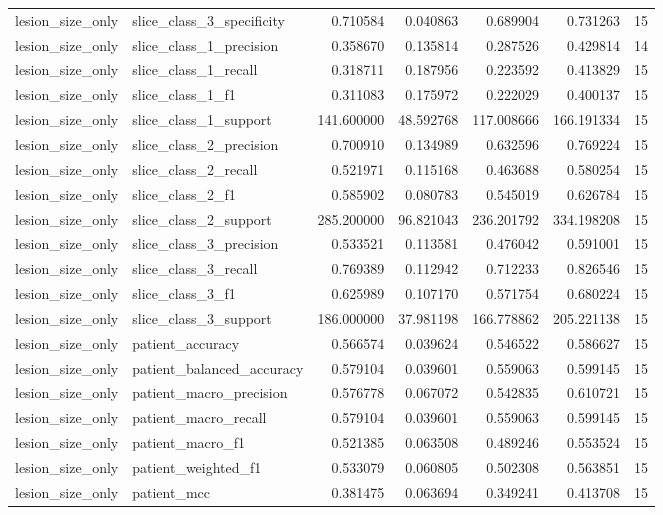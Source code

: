 \begin{tabular}{llrrrrr}
lesion_size_only & slice_class_3_specificity & 0.710584 & 0.040863 & 0.689904 & 0.731263 & 15 \\
lesion_size_only & slice_class_1_precision & 0.358670 & 0.135814 & 0.287526 & 0.429814 & 14 \\
lesion_size_only & slice_class_1_recall & 0.318711 & 0.187956 & 0.223592 & 0.413829 & 15 \\
lesion_size_only & slice_class_1_f1 & 0.311083 & 0.175972 & 0.222029 & 0.400137 & 15 \\
lesion_size_only & slice_class_1_support & 141.600000 & 48.592768 & 117.008666 & 166.191334 & 15 \\
lesion_size_only & slice_class_2_precision & 0.700910 & 0.134989 & 0.632596 & 0.769224 & 15 \\
lesion_size_only & slice_class_2_recall & 0.521971 & 0.115168 & 0.463688 & 0.580254 & 15 \\
lesion_size_only & slice_class_2_f1 & 0.585902 & 0.080783 & 0.545019 & 0.626784 & 15 \\
lesion_size_only & slice_class_2_support & 285.200000 & 96.821043 & 236.201792 & 334.198208 & 15 \\
lesion_size_only & slice_class_3_precision & 0.533521 & 0.113581 & 0.476042 & 0.591001 & 15 \\
lesion_size_only & slice_class_3_recall & 0.769389 & 0.112942 & 0.712233 & 0.826546 & 15 \\
lesion_size_only & slice_class_3_f1 & 0.625989 & 0.107170 & 0.571754 & 0.680224 & 15 \\
lesion_size_only & slice_class_3_support & 186.000000 & 37.981198 & 166.778862 & 205.221138 & 15 \\
lesion_size_only & patient_accuracy & 0.566574 & 0.039624 & 0.546522 & 0.586627 & 15 \\
lesion_size_only & patient_balanced_accuracy & 0.579104 & 0.039601 & 0.559063 & 0.599145 & 15 \\
lesion_size_only & patient_macro_precision & 0.576778 & 0.067072 & 0.542835 & 0.610721 & 15 \\
lesion_size_only & patient_macro_recall & 0.579104 & 0.039601 & 0.559063 & 0.599145 & 15 \\
lesion_size_only & patient_macro_f1 & 0.521385 & 0.063508 & 0.489246 & 0.553524 & 15 \\
lesion_size_only & patient_weighted_f1 & 0.533079 & 0.060805 & 0.502308 & 0.563851 & 15 \\
lesion_size_only & patient_mcc & 0.381475 & 0.063694 & 0.349241 & 0.413708 & 15 \\

\end{tabular}
